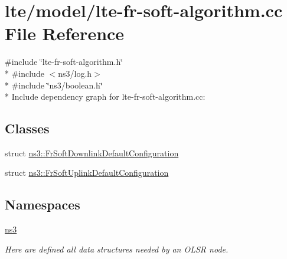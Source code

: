 \hypertarget{lte-fr-soft-algorithm_8cc}{}\section{lte/model/lte-\/fr-\/soft-\/algorithm.cc File Reference}
\label{lte-fr-soft-algorithm_8cc}
{\ttfamily \#include \char`\"{}lte-\/fr-\/soft-\/algorithm.\+h\char`\"{}}\\*
{\ttfamily \#include $<$ns3/log.\+h$>$}\\*
{\ttfamily \#include \char`\"{}ns3/boolean.\+h\char`\"{}}\\*
Include dependency graph for lte-\/fr-\/soft-\/algorithm.cc\+:
\subsection*{Classes}
\begin{DoxyCompactItemize}
\item 
struct \hyperlink{structns3_1_1FrSoftDownlinkDefaultConfiguration}{ns3\+::\+Fr\+Soft\+Downlink\+Default\+Configuration}
\item 
struct \hyperlink{structns3_1_1FrSoftUplinkDefaultConfiguration}{ns3\+::\+Fr\+Soft\+Uplink\+Default\+Configuration}
\end{DoxyCompactItemize}
\subsection*{Namespaces}
\begin{DoxyCompactItemize}
\item 
 \hyperlink{namespacens3}{ns3}
\begin{DoxyCompactList}\small\item\em Here are defined all data structures needed by an O\+L\+SR node. \end{DoxyCompactList}\end{DoxyCompactItemize}
